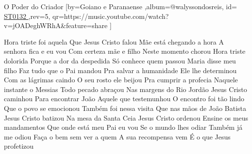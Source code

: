 \beginsong
{O Poder do Criador %
}[by={Goiano e Paranaense %
},album={@walyssondosreis},
id={\href{https://music.youtube.com/watch?v=jOADeghWRhA&feature=share
}{ ST0132 %
}},rev={5}, %
qr={https://music.youtube.com/watch?v=jOADeghWRhA&feature=share %
}]


\beginverse 
 Hora triste foi aquela
Que Jesus Cristo falou
 Mãe está chegando a hora
A senhora fica e eu vou
 Com certeza mãe e filho
Neste momento chorou
 Hora triste dolorida 
Porque a dor da despedida
Só conhece quem passou
\endverse
{}
\beginverse
 Maria disse meu filho 
Faz tudo que o Pai mandou
 Pra salvar a humanidade
Ele lhe determinou
 Com as lágrimas caindo
O seu rosto ele beijou
 Pra cumprir a profecia 
Naquele instante o Messias
Todo pecado abraçou
\endverse
{}
\beginverse
 Nas margens do Rio Jordão
Jesus Cristo caminhou
 Para encontrar João
Aquele que testemunhou
 O encontro foi tão lindo
Que o povo se emocionou
 Também foi nessa visita
Que nas mãos de João Batista
Jesus Cristo batizou
\endverse
{}
\beginverse
 Na mesa da Santa Ceia
Jesus Cristo ordenou
 Ensine os meus mandamentos
Que onde está meu Pai eu vou
 Se o mundo lhes odiar
Também já me odiou
 Faça o bem sem ver a quem 
A sua recompensa vem
É o que Jesus profetizou
\endverse

\vspace{4em} %

\endsong
